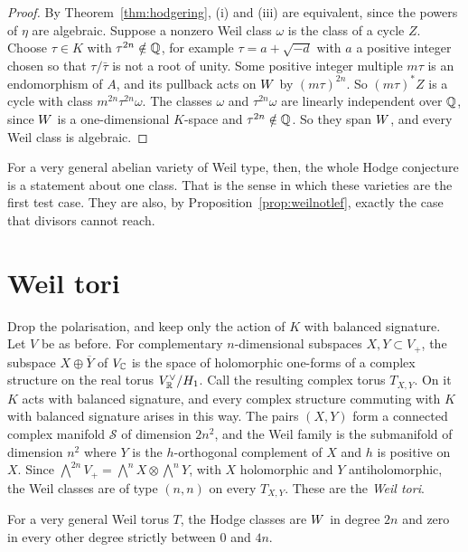 \begin{proof}
By Theorem~\ref{thm:hodgering}, (i) and (iii) are equivalent, since the
powers of $\eta$ are algebraic. Suppose a nonzero Weil class $\omega$ is the
class of a cycle $Z$. Choose $\tau\in K$ with $\tau^{2n}\notin\mathbb{Q}$, for
example $\tau=a+\sqrt{-d}$ with $a$ a positive integer chosen so that
$\tau/\bar\tau$ is not a root of unity. Some positive integer multiple $m\tau$
is an endomorphism of $A$, and its pullback acts on $W$ by
$(m\tau)^{2n}$. So $(m\tau)^{*}Z$ is a cycle with class $m^{2n}\tau^{2n}\omega$.
The classes $\omega$ and $\tau^{2n}\omega$ are linearly independent over
$\mathbb{Q}$, since $W$ is a one-dimensional $K$-space and $\tau^{2n}\notin\mathbb{Q}$.
So they span $W$, and every Weil class is algebraic.
\end{proof}

For a very general abelian variety of Weil type, then, the whole Hodge
conjecture is a statement about one class. That is the sense in which these
varieties are the first test case. They are also, by
Proposition~\ref{prop:weilnotlef}, exactly the case that divisors cannot
reach.

\section{Weil tori}\label{sec:voisintori}

Drop the polarisation, and keep only the action of $K$ with balanced
signature. Let $V$ be as before. For complementary $n$-dimensional
subspaces $X,Y\subset V_{+}$, the subspace $X\oplus\overline{Y}$ of
$V_{\mathbb{C}}$ is the space of holomorphic one-forms of a complex structure on
the real torus $V_{\mathbb{R}}^{\vee}/H_{1}$. Call the resulting complex torus
$T_{X,Y}$. On it $K$ acts with balanced signature, and every complex
structure commuting with $K$ with balanced signature arises in this way.
The pairs $(X,Y)$ form a connected complex manifold $\mathcal S$ of
dimension $2n^{2}$, and the Weil family is the submanifold of dimension
$n^{2}$ where $Y$ is the $h$-orthogonal complement of $X$ and $h$ is
positive on $X$. Since
$\bigwedge^{2n}V_{+}=\bigwedge^{n}X\otimes\bigwedge^{n}Y$, with $X$
holomorphic and $Y$ antiholomorphic, the Weil classes are of type $(n,n)$
on every $T_{X,Y}$. These are the \emph{Weil tori}.

\begin{proposition}\label{prop:weiltorushodge}
For a very general Weil torus $T$, the Hodge classes are $W$ in degree
$2n$ and zero in every other degree strictly between $0$ and $4n$.
\end{proposition}

